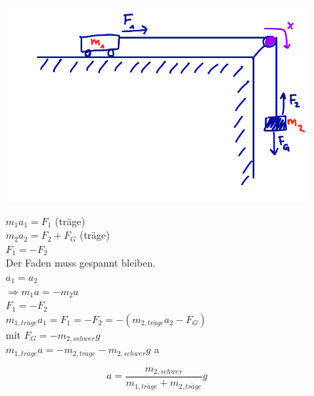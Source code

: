 \documentclass[11pt]{article}
\begin{document}
		\begin{figure}[htbp]
			\begin{minipage}[t]{6cm}
				\vspace{0pt}
				\centering
				\includegraphics[scale=0.35]{IMG_E8A9C85E8431-1.jpeg}
			\end{minipage}
			\hfill
			\begin{minipage}[t]{6cm}
				\vspace{0pt}
				$ m_1 a_1 = F_1 $ (träge)\\
				$ m_2 a_2 = F_2 + F_G $ (träge)\\
				$ F_1 = - F_2 $\\
				Der Faden muss gespannt bleiben.\\
				$ a_1 = a_2 $\\
				$\Rightarrow m_1 a = - m_2 a $\\
				$ F_1 = -F_2 $\\
				$ m_{1, tr\ddot{a}ge} a_1 = F_1 = - F_2 = -(m_{2, tr\ddot{a}ge} a_2 -F_G) $\\
				mit $ F_G = -m_{2, schwer} g $\\
				$m_{1, tr\ddot{a}ge} a = - m_{2, tr\ddot{a}ge} - m_{2, schwer} g$	\ddot a
			\end{minipage}
		\end{figure}
		\[ a = \frac{m_{2, schwer}}{m_{1,tr\ddot{a}ge} + m_{2,tr\ddot{a}ge}} g \]
				
\end{document}
